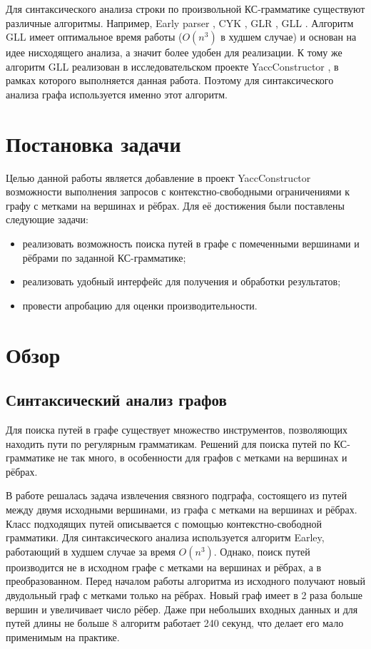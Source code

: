 \documentclass[14pt]{matmex-diploma}
\begin{document}
  Для синтаксического анализа строки по произвольной КС-грамматике существуют различные алгоритмы. Например, Early parser \cite{Early} , CYK \cite{CYK}, GLR \cite{glr}, GLL \cite{gll}. Алгоритм GLL имеет оптимальное время работы ($O(n^3)$ в худшем случае) и основан на идее нисходящего анализа, а значит более удобен для реализации. К тому же алгоритм GLL реализован в исследовательском проекте YaccConstructor \cite{YaccConstructorPage}, в рамках которого выполняется данная работа. Поэтому для синтаксического анализа графа используется именно этот алгоритм. 

\section{Постановка задачи}

Целью данной работы является добавление в проект YaccConstructor возможности выполнения запросов с контекстно-свободными ограничениями к графу с метками на вершинах и рёбрах. Для её достижения были поставлены следующие задачи:

\begin{itemize}
    \item реализовать возможность поиска путей в графе с помеченными вершинами и рёбрами по заданной КС-грамматике;
    \item реализовать удобный интерфейс для получения и обработки результатов;
    \item провести апробацию для оценки производительности.
    
\end{itemize}

\section{Обзор}

\subsection{Синтаксический анализ графов}

Для поиска путей в графе существует множество инструментов, позволяющих находить пути по регулярным грамматикам. Решений для поиска путей по КС-грамматике не так много, в особенности для графов с метками на вершинах и рёбрах.

В работе \cite{subgraph} решалась задача извлечения связного подграфа, состоящего из путей между двумя исходными вершинами, из графа с метками на вершинах и рёбрах. Класс подходящих путей описывается с помощью контекстно-свободной грамматики. Для синтаксического анализа используется алгоритм Earley, работающий в худшем случае за время $O(n^3)$. Однако, поиск путей производится не в исходном графе с метками на вершинах и рёбрах, а в преобразованном. Перед началом работы алгоритма из исходного получают новый двудольный граф с метками только на рёбрах. Новый граф имеет в 2 раза больше вершин и увеличивает число рёбер. Даже при небольших входных данных и для путей длины не больше 8 алгоритм работает 240 секунд, что делает его мало применимым на практике.
\end{document}
